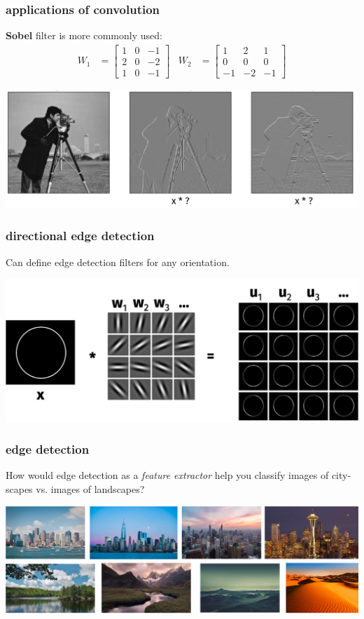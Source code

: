 \documentclass[handout,compress]{beamer}
\begin{document}
\begin{frame}
	\frametitle{applications of convolution}
	\textbf{Sobel} filter is more commonly used:
	\begin{align*}
	W_1 &= \begin{bmatrix}
	1 & 0 & -1\\
	2 & 0 & -2\\
	1 & 0 & -1
	\end{bmatrix} & 	
	W_2 &= \begin{bmatrix}
	1 & 2 & 1\\
	0 & 0 & 0\\
	-1 & -2 & -1
	\end{bmatrix}
	\end{align*}
	\begin{center}
		\includegraphics[width=\textwidth]{conv_test.png}
	\end{center}
\end{frame}

\begin{frame}
	\frametitle{directional edge detection}
	Can define edge detection filters for any orientation.
	\begin{center}
		\includegraphics[width=\textwidth]{directional_edge.png}
	\end{center}
\end{frame}

\begin{frame}
	\frametitle{edge detection}
	How would edge detection as a \emph{feature extractor} help you classify images of city-scapes vs. images of landscapes?
	\begin{center}
		\includegraphics[width=\textwidth]{scapes.png}
	\end{center}
\end{frame}
\end{document}
